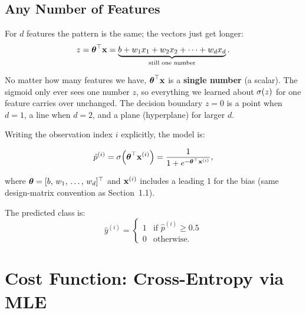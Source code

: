 \documentclass[12pt, a4paper]{article}
\begin{document}
\subsection{Any Number of Features}

For $d$ features the pattern is the same; the vectors just get longer:
\[
  z = \boldsymbol{\theta}^{\top}\mathbf{x}
  = \underbrace{b + w_1 x_1 + w_2 x_2 + \cdots + w_d x_d}_{\text{still one number}}.
\]

\begin{notebox}
  No matter how many features we have, $\boldsymbol{\theta}^{\top}\mathbf{x}$ is a
  \textbf{single number} (a scalar).
  The sigmoid only ever sees one number $z$, so everything we learned
  about $\sigma(z)$ for one feature carries over unchanged.
  The decision boundary $z = 0$ is a point when $d = 1$, a line when $d = 2$,
  and a plane (hyperplane) for larger $d$.
\end{notebox}

Writing the observation index $i$ explicitly, the model is:

\begin{equation}
  \hat{p}^{(i)} = \sigma\!\left(\boldsymbol{\theta}^{\top}\mathbf{x}^{(i)}\right)
  = \frac{1}{1 + e^{-\boldsymbol{\theta}^{\top}\mathbf{x}^{(i)}}},
  \label{eq:logreg}
\end{equation}

where $\boldsymbol{\theta} = [b,\, w_1,\, \ldots,\, w_d]^{\top}$ and $\mathbf{x}^{(i)}$ includes a
leading 1 for the bias (same design-matrix convention as Section~1.1).

The predicted class is:
\[
  \hat{y}^{(i)} =
  \begin{cases} 1 & \text{if } \hat{p}^{(i)} \ge 0.5 \\ 0 & \text{otherwise.} \end{cases}
\]

\section{Cost Function: Cross-Entropy via MLE}
\end{document}
